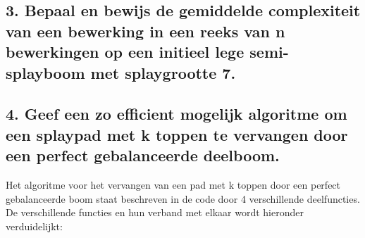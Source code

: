 \documentclass[dutch, 11pt]{report}
\begin{document}
\subsection*{3. Bepaal en bewijs de gemiddelde complexiteit van een bewerking in een reeks van n bewerkingen op een initieel lege semi-splayboom met splaygrootte 7.}

\subsection*{4. Geef een zo efficient mogelijk algoritme om een splaypad met k toppen te vervangen door een perfect gebalanceerde deelboom.}
Het algoritme voor het vervangen van een pad met k toppen door een perfect gebalanceerde boom staat beschreven in de code door 4 verschillende deelfuncties. De verschillende functies en hun verband met elkaar wordt hieronder verduidelijkt:
\end{document}
